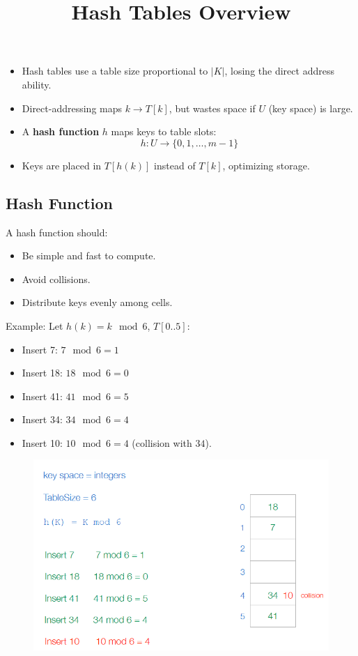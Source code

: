 \title{Hash Tables Overview}

\begin{itemize}
    \item Hash tables use a table size proportional to \( |K| \), losing the direct address ability.
    \item Direct-addressing maps \( k \to T[k] \), but wastes space if \( U \) (key space) is large.
    \item A \textbf{hash function} \( h \) maps keys to table slots:
    \[
    h : U \to \{ 0, 1, \dots, m-1 \}
    \]
    \item Keys are placed in \( T[h(k)] \) instead of \( T[k] \), optimizing storage.
\end{itemize}




\subsection{Hash Function}
A hash function should:
\begin{itemize}
    \item Be simple and fast to compute.
    \item Avoid collisions.
    \item Distribute keys evenly among cells.
\end{itemize}
Example: Let \( h(k) = k \mod 6 \), \( T[0..5] \):
\begin{itemize}
    \item Insert 7: \( 7 \mod 6 = 1 \)
    \item Insert 18: \( 18 \mod 6 = 0 \)
    \item Insert 41: \( 41 \mod 6 = 5 \)
    \item Insert 34: \( 34 \mod 6 = 4 \)
    \item Insert 10: \( 10 \mod 6 = 4 \) (collision with \( 34 \)).
\end{itemize}

\begin{figure}[H]
    \centering
    \includegraphics[width=0.75\linewidth]{hash function exam.png}
    \label{fig:enter-label}
\end{figure}


